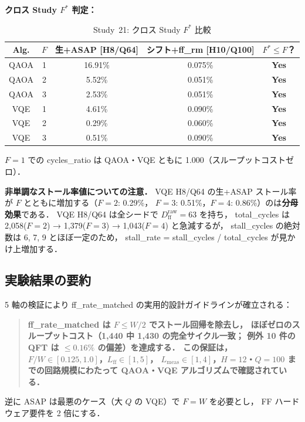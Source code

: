 \documentclass[journal,10pt,twocolumn]{IEEEtran}
\begin{document}
\textbf{クロス Study $F^*$ 判定：}

\begin{table}[h]
\centering
\caption{Study~21: クロス Study $F^*$ 比較}
\label{tab:study21}
\begin{tabular}{ccccc}
\toprule
Alg. & $F$ & 生+ASAP [H8/Q64] & シフト+ff\_rm [H10/Q100]
  & $F^* \leq F$？ \\
\midrule
QAOA & 1 & 16.91\% & 0.075\% & \textbf{Yes} \\
QAOA & 2 &  5.52\% & 0.051\% & \textbf{Yes} \\
QAOA & 3 &  2.53\% & 0.051\% & \textbf{Yes} \\
VQE  & 1 &  4.61\% & 0.090\% & \textbf{Yes} \\
VQE  & 2 &  0.29\% & 0.060\% & \textbf{Yes} \\
VQE  & 3 &  0.51\% & 0.090\% & \textbf{Yes} \\
\bottomrule
\end{tabular}
\end{table}

$F=1$ での cycles\_ratio は QAOA・VQE ともに 1.000（スループットコストゼロ）．

\textbf{非単調なストール率値についての注意．}
VQE H8/Q64 の生+ASAP ストール率が $F$ とともに増加する（$F=2$: 0.29\%，
$F=3$: 0.51\%，$F=4$: 0.86\%）のは\textbf{分母効果}である．
VQE H8/Q64 は全シードで $D_{\mathrm{ff}}^{\mathrm{raw}} = 63$ を持ち，
total\_cycles は 2,058($F=2$) → 1,379($F=3$) → 1,043($F=4$) と急減するが，
stall\_cycles の絶対数は 6, 7, 9 とほぼ一定のため，
stall\_rate = stall\_cycles / total\_cycles が見かけ上増加する．

\subsection{実験結果の要約}

5 軸の検証により ff\_rate\_matched の実用的設計ガイドラインが確立される：

\begin{quote}
\textbf{ff\_rate\_matched は $F \leq W/2$ でストール回帰を除去し，
ほぼゼロのスループットコスト（1,440 中 1,430 の完全サイクル一致；
例外 10 件の QFT は $\leq 0.16\%$ の偏差）を達成する．
この保証は，$F/W \in [0.125, 1.0]$，$L_{\mathrm{ff}} \in [1, 5]$，
$L_{\mathrm{meas}} \in [1, 4]$，$H=12$・$Q=100$ までの回路規模にわたって
QAOA・VQE アルゴリズムで確認されている．}
\end{quote}

逆に ASAP は最悪のケース（大 $Q$ の VQE）で $F = W$ を必要とし，
FF ハードウェア要件を 2 倍にする．
\end{document}
